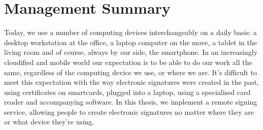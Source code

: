 \chapter*{Management Summary}
\label{chap:managementSummary}


Today, we use a number of computing devices interchangeably on a daily basis: a desktop workstation at the office, a laptop computer
on the move, a tablet in the living room and of course, always by our side, the smartphone.
In an increasingly cloudified and mobile world our expectation is to be able to do our work all the same,
regardless of the computing device we use, or where we are.
It's difficult to meet this expectation with the way electronic signatures were created in the past,
using certificates on smartcards, plugged into a laptop, using a specialised card reader and accompanying software.
In this thesis, we implement a remote signing service, allowing people to create electronic signatures no matter
where they are or what device they're using.

